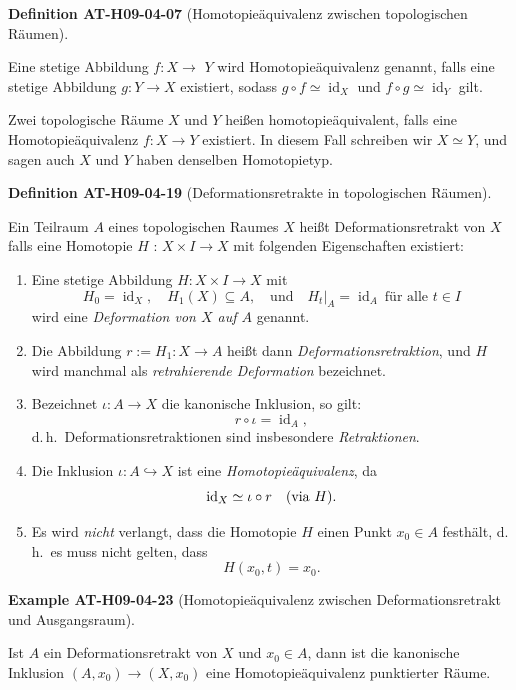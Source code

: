 \documentclass[10pt, letterpaper]{article}
\newcommand{\CustomHeading}[3]{%
  \par\medskip\noindent%
  \textbf{#1 #2} \textnormal{(#3)}.\enskip%
}
\newenvironment{DEF}[2]{\CustomHeading{Definition}{#1}{#2}}{}
\newenvironment{EXA}[2]{\CustomHeading{Example}{#1}{#2}}{}
\begin{document}
\begin{DEF}{AT-H09-04-07}{Homotopieäquivalenz zwischen topologischen Räumen}
Eine stetige Abbildung $f: X \rightarrow$ $Y$ wird Homotopieäquivalenz genannt, falls eine stetige Abbildung $g: Y \rightarrow X$ existiert, sodass $g \circ f \simeq \operatorname{id}_{X}$ und $f \circ g \simeq \operatorname{id}_{Y}$ gilt. 

Zwei topologische Räume $X$ und $Y$ heißen homotopieäquivalent, falls eine Homotopieäquivalenz $f: X \rightarrow Y$ existiert. In diesem Fall schreiben wir $X \simeq Y$, und sagen auch $X$ und $Y$ haben denselben Homotopietyp.
\end{DEF}

\begin{DEF}{AT-H09-04-19}{Deformationsretrakte in topologischen Räumen}
Ein Teilraum $A$ eines topologischen Raumes $X$ heißt Deformationsretrakt von $X$ falls eine Homotopie $H$ : $X \times I \rightarrow X$ mit folgenden Eigenschaften existiert:
\begin{enumerate}
\item Eine stetige Abbildung \( H: X \times I \rightarrow X \) mit
\[
H_0 = \operatorname{id}_X, \quad H_1(X) \subseteq A, \quad \text{und} \quad H_t|_A = \operatorname{id}_A \ \text{für alle } t \in I
\]
wird eine \emph{Deformation von \( X \) auf \( A \)} genannt.

\item Die Abbildung \( r := H_1: X \rightarrow A \) heißt dann \emph{Deformationsretraktion}, und \( H \) wird manchmal als \emph{retrahierende Deformation} bezeichnet.

\item Bezeichnet \( \iota: A \rightarrow X \) die kanonische Inklusion, so gilt:
\[
r \circ \iota = \operatorname{id}_A,
\]
d.\,h.\ Deformationsretraktionen sind insbesondere \emph{Retraktionen}.

\item Die Inklusion \( \iota: A \hookrightarrow X \) ist eine \emph{Homotopieäquivalenz}, da
\[
\operatorname{id}_X \simeq \iota \circ r \quad \text{(via \( H \))}.
\]

\item Es wird \emph{nicht} verlangt, dass die Homotopie \( H \) einen Punkt \( x_0 \in A \) festhält, d.\,h.\ es muss nicht gelten, dass
\[
H(x_0, t) = x_0.
\]
\end{enumerate}
\end{DEF}

\begin{EXA}{AT-H09-04-23}{Homotopieäquivalenz zwischen Deformationsretrakt und Ausgangsraum}
Ist $A$ ein Deformationsretrakt von $X$ und $x_{0} \in A$, dann ist die kanonische Inklusion $\left(A, x_{0}\right) \rightarrow\left(X, x_{0}\right)$ eine Homotopieäquivalenz punktierter Räume.
\end{EXA}
\end{document}
